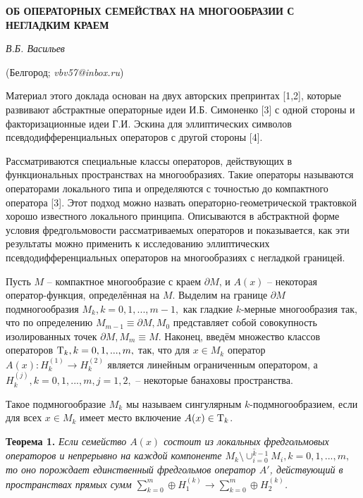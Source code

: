 \begin{center}
    {\bf ОБ ОПЕРАТОРНЫХ СЕМЕЙСТВАХ НА МНОГООБРАЗИИ С НЕГЛАДКИМ КРАЕМ}

    {\it В.Б. Васильев}

    (Белгород; {\it vbv57@inbox.ru})
\end{center}


Материал этого доклада основан на двух авторских препринтах [1,2], которые развивают абстрактные операторные идеи И.Б. Симоненко [3] с одной стороны и факторизационные идеи Г.И. Эскина для эллиптических символов псевдодифференциальных операторов с другой стороны [4].

Рассматриваются специальные классы операторов, действующих в функциональных пространствах на многообразиях. Такие операторы называются операторами локального типа и определяются с точностью до компактного оператора [3]. Этот подход можно назвать операторно-геометрической трактовкой хорошо известного локального принципа. Описываются в абстрактной форме условия фредгольмовости рассматриваемых операторов и показывается, как эти результаты можно применить к исследованию эллиптических псевдодифференциальных операторов на многообразиях с негладкой границей.

Пусть $M$ -- компактное многообразие с краем $\partial M$, и $A(x)$ -- некоторая оператор-функция, определённая на $M$. Выделим на границе $\partial M$ подмногообразия $M_k, k=0,1,...,m-1,$ как гладкие $k$-мерные многообразия так, что по определению $M_{m-1}\equiv\partial M, M_0$ представляет собой совокупность изолированных точек $\partial M, M_m\equiv M$. Наконец, введём множество классов операторов ${\rm T}_k, k=0,1,...,m,$ так, что для $x\in M_k$ оператор $A(x): H^{(1)}_k\rightarrow H^{(2)}_k$ является линейным ограниченным оператором, а $H^{(j)}_k, k=0,1,...,m, j=1,2,$ -- некоторые банаховы пространства.


Такое подмногообразие $M_k$ мы называем сингулярным $k$-подмногообразием, если для всех $x\in M_k$ имеет место включение $A(x)\in{\rm T}_k$.

\textbf{Теорема 1.} {\it
Если семейство $A(x)$ состоит из локальных фредгольмовых операторов и непрерывно на каждой компоненте $\overline{M_k\setminus\cup_{i=0}^{k-1}M_i}, k=0,1,...,m,$ то оно порождает единственный фредгольмов оператор
$A'$, действующий в пространствах прямых сумм $\sum\limits_{k=0}^m\oplus H^{(k)}_1\rightarrow\sum\limits_{k=0}^m\oplus H^{(k)}_2$.
}


